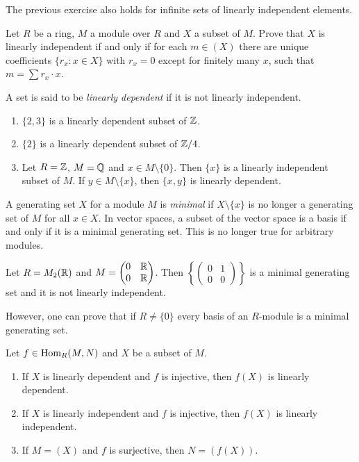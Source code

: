 The previous exercise also holds for infinite sets of linearly independent elements. 

\begin{bonus}
     Let $R$ be a ring, $M$ a module over $R$ and $X$ a subset of $M$. Prove that 
     $X$ is linearly independent if and only if for each $m\in (X)$ there are unique 
     coefficients $\{r_x:x\in X\}$ with $r_x=0$ except for finitely many $x$, such that 
     $m=\sum r_x\cdot x$. 
\end{bonus}

A set is said to be 
\emph{linearly dependent} if it is not linearly independent.
    
\begin{example}
\leavevmode
\begin{enumerate}
    \item $\{2,3\}$ is a linearly dependent subset of $\mathbb{Z}$.
    \item $\{2\}$ is a linearly dependent subset of $\mathbb{Z}/4$.
    \item Let $R=\mathbb{Z}$, $M=\mathbb{Q}$ and $x\in M\setminus\{0\}$. 
        Then $\{x\}$ is a linearly independent subset of $M$. If $y\in M\setminus\{x\}$, then
        $\{x,y\}$ is linearly dependent.  
\end{enumerate}    
\end{example}

A generating set $X$ for a module $M$ is \emph{minimal} if 
$X\setminus\{x\}$ is no longer a generating set of $M$ for all $x\in X$. 
In vector spaces, a subset of the vector space is a basis
if and only if it is a minimal generating set. This is no longer true 
for arbitrary modules.

\begin{example}
Let $R=M_2(\mathbb{R})$ and $M=\begin{pmatrix}
        0&\mathbb{R}\\
        0&\mathbb{R} 
    \end{pmatrix}$. Then $\left\{\begin{pmatrix}0&1\\0&0\end{pmatrix}\right\}$ is a minimal generating 
    set and it is not linearly independent. 
\end{example}

However, one can prove that if $R\ne\{0\}$ 
every basis of an $R$-module is a minimal generating set. 

\begin{exercise}
\label{xca:homLI}
    Let $f\in\operatorname{Hom}_R(M,N)$ and $X$ be a subset of $M$. 
    \begin{enumerate}
        \item If $X$ is linearly dependent and $f$ is injective, then $f(X)$ is linearly dependent.
        \item If $X$ is linearly independent and $f$ is injective, then $f(X)$ is linearly independent. 
        \item If $M=(X)$ and $f$ is surjective, then $N=(f(X))$. 
    \end{enumerate}
\end{exercise}

